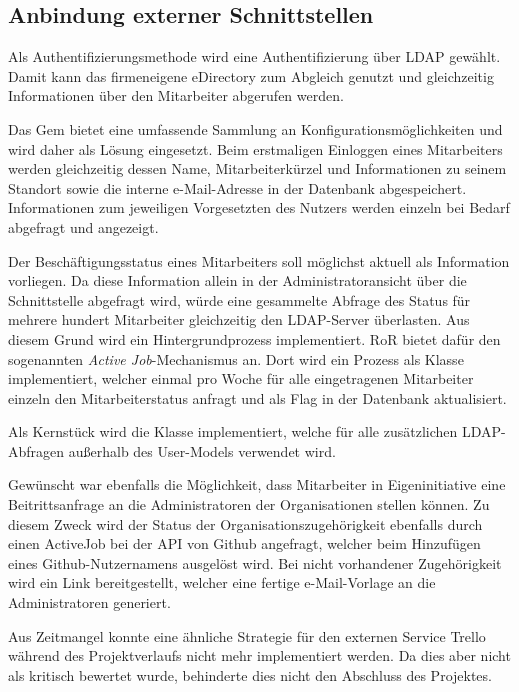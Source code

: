 \subsection{Anbindung externer Schnittstellen}
\label{sec:Anbindung externer Schnittstellen}
Als Authentifizierungsmethode wird eine Authentifizierung über \acs{LDAP} gewählt. Damit
kann das firmeneigene eDirectory zum Abgleich genutzt und gleichzeitig Informationen über
den Mitarbeiter abgerufen werden.

Das Gem  bietet eine umfassende Sammlung an Konfigurationsmöglichkeiten und wird
daher als Lösung eingesetzt. Beim erstmaligen Einloggen eines Mitarbeiters werden gleichzeitig
dessen Name, Mitarbeiterkürzel und Informationen zu seinem Standort sowie die interne
e-Mail-Adresse in der Datenbank abgespeichert. Informationen zum jeweiligen Vorgesetzten des
Nutzers werden einzeln bei Bedarf abgefragt und angezeigt.

Der Beschäftigungsstatus eines Mitarbeiters soll möglichst aktuell als Information vorliegen. Da diese
Information allein in der Administratoransicht \bzw über die Schnittstelle abgefragt wird,
würde eine gesammelte Abfrage des Status für mehrere hundert Mitarbeiter gleichzeitig den LDAP-Server
überlasten. Aus diesem Grund wird ein Hintergrundprozess implementiert. RoR bietet dafür den
sogenannten \textit{Active Job}-Mechanismus an. Dort wird ein Prozess als Klasse implementiert,
welcher einmal pro Woche für alle eingetragenen Mitarbeiter einzeln den Mitarbeiterstatus anfragt
und als Flag in der Datenbank aktualisiert.


Als Kernstück wird die Klasse  implementiert, welche für alle zusätzlichen
LDAP-Abfragen außerhalb des User-Models verwendet wird.


Gewünscht war ebenfalls die Möglichkeit, dass Mitarbeiter \ggfs in Eigeninitiative eine
Beitrittsanfrage an die Administratoren der Organisationen stellen können. Zu diesem Zweck wird der
Status der Organisationszugehörigkeit ebenfalls durch einen ActiveJob bei der API von Github
angefragt, welcher beim Hinzufügen eines Github-Nutzernamens ausgelöst wird.
Bei nicht vorhandener Zugehörigkeit wird ein Link bereitgestellt, welcher eine fertige e-Mail-Vorlage
an die Administratoren generiert.

Aus Zeitmangel konnte eine ähnliche Strategie für den externen Service Trello während des
Projektverlaufs nicht mehr implementiert werden. Da dies aber nicht als kritisch bewertet wurde,
behinderte dies nicht den Abschluss des Projektes.

